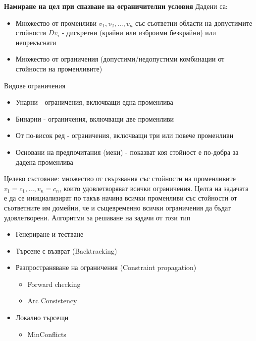 \documentclass{article}
\begin{document}
\textbf{Намиране на цел при спазване на ограничителни условия} \newline\newline
Дадени са:
\begin{itemize}
    \item Множество от променливи $v_1, v_2, ..., v_n$ със съответни области на допустимите стойности $Dv_i$ -
    дискретни (крайни или изброими безкрайни) или непрекъснати
    \item Множество от ограничения (допустими/недопустими комбинации от стойности на променливите)
\end{itemize}
Видове ограничения
\begin{itemize}
    \item Унарни - ограничения, включващи една променлива
    \item Бинарни - ограничения, включващи две променливи
    \item От по-висок ред - ограничения, включващи три или повече променливи
    \item Основани на предпочитания (меки) - показват коя стойност е по-добра за дадена променлива
\end{itemize}
Целево състояние: множество от свързвания със стойности на променливите $v_1 = c_1, ..., v_n = c_n$, които удовлетворяват всички
ограничения. \newline\newline
Целта на задачата е да се инициализират по такъв начина всички променливи със стойности от съответните им домейни, че и същевременно
всички ограничения да бъдат удовлетворени. \newline\newline
Алгоритми за решаване на задачи от този тип
\begin{itemize}
    \item Генериране и тестване
    \item Търсене с възврат (Backtracking)
    \item Разпространяване на ограничения (Constraint propagation)
    \begin{itemize}
        \item Forward checking
        \item Arc Consistency
    \end{itemize}
    \item Локално търсещи
    \begin{itemize}
        \item MinConflicts
    \end{itemize}
\end{itemize}
\end{document}
